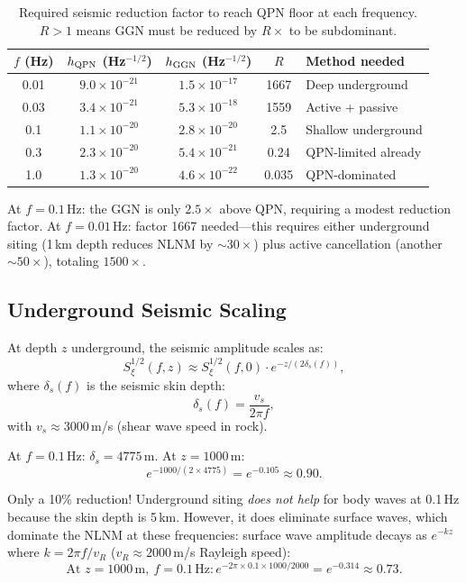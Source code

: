 \documentclass[11pt]{article}
\theoremstyle{definition}
\theoremstyle{remark}
\begin{document}
\begin{table}[h]
\centering
\caption{Required seismic reduction factor to reach QPN floor at each frequency.
$R > 1$ means GGN must be reduced by $R \times$ to be subdominant.}
\begin{tabular}{@{}ccccl@{}}
\toprule
$f$ (Hz) & $h_{\rm QPN}$ (Hz$^{-1/2}$) & $h_{\rm GGN}$ (Hz$^{-1/2}$) & $R$ & Method needed \\
\midrule
0.01 & $9.0\times10^{-21}$ & $1.5\times10^{-17}$ & 1667 & Deep underground \\
0.03 & $3.4\times10^{-21}$ & $5.3\times10^{-18}$ & 1559 & Active + passive \\
0.1  & $1.1\times10^{-20}$ & $2.8\times10^{-20}$ & 2.5 & Shallow underground \\
0.3  & $2.3\times10^{-20}$ & $5.4\times10^{-21}$ & 0.24 & QPN-limited already \\
1.0  & $1.3\times10^{-20}$ & $4.6\times10^{-22}$ & 0.035 & QPN-dominated \\
\bottomrule
\end{tabular}
\end{table}

At $f = 0.1$\,Hz: the GGN is only $2.5\times$ above QPN, requiring a modest
reduction factor. At $f = 0.01$\,Hz: factor 1667 needed---this requires either
underground siting (1\,km depth reduces NLNM by $\sim 30\times$) plus active
cancellation (another $\sim 50\times$), totaling $1500\times$.

\subsection{Underground Seismic Scaling}

At depth $z$ underground, the seismic amplitude scales as:
\begin{equation}
S_\xi^{1/2}(f, z) \approx S_\xi^{1/2}(f, 0) \cdot e^{-z/(2\delta_s(f))},
\end{equation}
where $\delta_s(f)$ is the seismic skin depth:
\begin{equation}
\delta_s(f) = \frac{v_s}{2\pi f},
\end{equation}
with $v_s \approx 3000$\,m/s (shear wave speed in rock).

At $f = 0.1$\,Hz: $\delta_s = 4775$\,m. At $z = 1000$\,m:
\begin{equation}
e^{-1000/(2\times4775)} = e^{-0.105} \approx 0.90.
\end{equation}

Only a 10\% reduction! Underground siting \emph{does not help} for body
waves at 0.1\,Hz because the skin depth is 5\,km. However, it does eliminate
surface waves, which dominate the NLNM at these frequencies:
surface wave amplitude decays as $e^{-kz}$ where $k = 2\pi f/v_R$
($v_R \approx 2000$\,m/s Rayleigh speed):
\begin{equation}
\text{At } z = 1000\,\mathrm{m},\ f = 0.1\,\mathrm{Hz}:
e^{-2\pi \times 0.1 \times 1000/2000} = e^{-0.314} \approx 0.73.
\end{equation}
\end{document}
